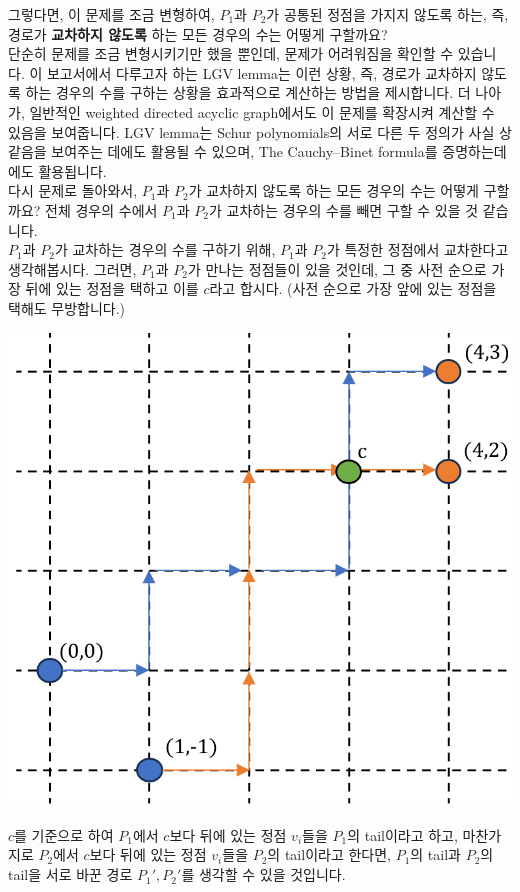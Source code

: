 \documentclass[a4paper]{article}
\begin{document}
그렇다면, 이 문제를 조금 변형하여, $P_1$과 $P_2$가 공통된 정점을 가지지 않도록 하는, 즉, 경로가 \textbf{교차하지 않도록} 하는 모든 경우의 수는 어떻게 구할까요?\\
단순히 문제를 조금 변형시키기만 했을 뿐인데, 문제가 어려워짐을 확인할 수 있습니다. 이 보고서에서 다루고자 하는 LGV lemma는 이런 상황, 즉, 경로가 교차하지 않도록 하는 경우의 수를 구하는 상황을 효과적으로 계산하는 방법을 제시합니다. 더 나아가, 일반적인 weighted directed acyclic graph에서도 이 문제를 확장시켜 계산할 수 있음을 보여줍니다. LGV lemma는 Schur polynomials의 서로 다른 두 정의가 사실 상 같음을 보여주는 데에도 활용될 수 있으며, The Cauchy–Binet formula를 증명하는데에도 활용됩니다.\\
다시 문제로 돌아와서, $P_1$과 $P_2$가 교차하지 않도록 하는 모든 경우의 수는 어떻게 구할까요? 전체 경우의 수에서 $P_1$과 $P_2$가 교차하는 경우의 수를 빼면 구할 수 있을 것 같습니다.\\
$P_1$과 $P_2$가 교차하는 경우의 수를 구하기 위해, $P_1$과 $P_2$가 특정한 정점에서 교차한다고 생각해봅시다. 그러면, $P_1$과 $P_2$가 만나는 정점들이 있을 것인데, 그 중 사전 순으로 가장 뒤에 있는 정점을 택하고 이를 $c$라고 합시다. (사전 순으로 가장 앞에 있는 정점을 택해도 무방합니다.)\\
\begin{center}
\includegraphics[scale=0.5]{image2.png}
\end{center}
$c$를 기준으로 하여 $P_1$에서 $c$보다 뒤에 있는 정점 $v_i$들을 $P_1$의 tail이라고 하고, 마찬가지로 $P_2$에서 $c$보다 뒤에 있는 정점 $v_i$들을 $P_2$의 tail이라고 한다면, $P_1$의 tail과 $P_2$의 tail을 서로 바꾼 경로 $P_1', P_2'$를 생각할 수 있을 것입니다.\\
\end{document}
